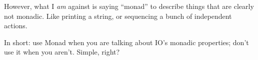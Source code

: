 \documentclass[]{article}
\begin{document}
\begin{itemize}
  However, what I \emph{am} against is saying ``monad'' to describe things that
  are clearly not monadic. Like printing a string, or sequencing a bunch of
  independent actions.

  In short: use Monad when you are talking about IO's monadic properties; don't
  use it when you aren't. Simple, right?
\end{itemize}
\end{document}
